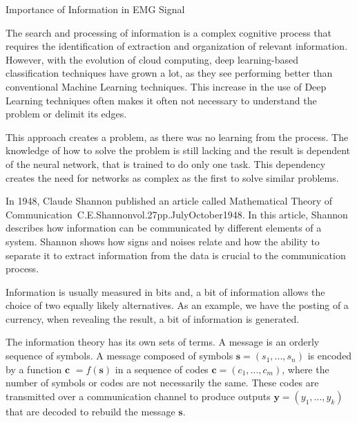 \documentclass[a4paper, 12pt]{ppgeb}
\makeatletter
\renewcommand{\section}{\@startsection
{section}
{1}
{0mm}
{-\baselineskip}
{0.5\baselineskip}
{\large\bfseries\scshape}}
\makeatother
\begin{document}
\section{Importance of Information in \ac{EMG} Signal}

The search and processing of information is a complex cognitive process that requires the identification of extraction and organization of relevant information. However, with the evolution of cloud computing, deep learning-based classification techniques have grown a lot, as they see performing better than conventional Machine Learning techniques. This increase in the use of Deep Learning techniques often makes it often not necessary to understand the problem or delimit its edges.

This approach creates a problem, as there was no learning from the process. The knowledge of how to solve the problem is still lacking and the result is dependent of the neural network, that is trained to do only one task. This dependency creates the need for networks as complex as the first to solve similar problems.

In 1948, Claude Shannon published an article called Mathematical Theory of Communication~\cite{mainreferences}{C.E.Shannonvol.27pp.JulyOctober1948}. In this article, Shannon describes how information can be communicated by different elements of a system. Shannon shows how signs and noises relate and how the ability to separate it to extract information from the data is crucial to the communication process.

Information is usually measured in bits and, a bit of information allows the choice of two equally likely alternatives. As an example, we have the posting of a currency, when revealing the result, a bit of information is generated.

The information theory has its own sets of terms. A message is an orderly sequence of symbols. A message composed of symbols \(\textbf{s} = (s_1, ..., s_n) \) is encoded by a function \( \textbf{c }= f(\textbf{s})\) in a sequence of codes \(\textbf{c} = (c_1, ..., c_m)\), where the number of symbols or codes are not necessarily the same. These codes are transmitted over a communication channel to produce outputs \(\textbf{y} = (y_1, ..., y_k)\) that are decoded to rebuild the message \(\textbf{s}\).
\end{document}
